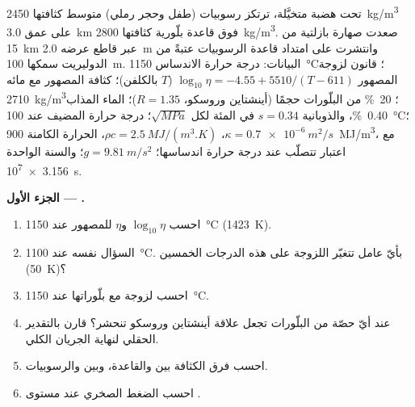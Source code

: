 \begin{problem}
\label{pb:b2:magma-emplacement:1}
تحت هضبة متخيَّلة، ترتكز رسوبيات (طفل وحجر رملي) متوسط كثافتها
\qty{2450}{kg/m^3} على عمق \qty{3.0}{km} فوق قاعدة بلّورية
كثافتها \qty{2800}{kg/m^3}. صعدت صهارة بازلتية من \qty{15}{km} عبر قاطع
عرضه \qty{2.0}{m} وانتشرت على امتداد قاعدة الرسوبيات عتبةً من الدوليريت
سمكها \qty{100}{m}. البيانات: درجة حرارة الاندساس \qty{1150}{\celsius}؛ قانون لزوجة
المصهور $\log_{10}\eta = -4.55 + 5510/(T - 611)$ ($T$ بالكلفن)؛ كثافة
المصهور مع مائه \qty{2710}{kg/m^3}؛ \qty{20}{\percent} من البلّورات حجمًا
(أينشتاين وروسكو، $R = 1.35$)؛ الماء المذاب \qty{0.40}{\percent}، والذوبانية
$s = 0.34$ في المئة لكل $\sqrt{\unit{MPa}}$؛ درجة حرارة المضيف عند 
\qty{100}{\celsius}؛ $\kappa = \qty{0.7e-6}{m^2/s}$، $\rho c = \qty{2.5}{MJ/(m^3.K)}$،
الحرارة الكامنة \qty{900}{MJ/m^3}، مع اعتبار  تتصلّب عند درجة حرارة
اندساسها؛ $g = \qty{9.81}{m/s^2}$؛ والسنة الواحدة \qty{3.156e7}{s}.

\medskip\noindent\textbf{الجزء الأول --- .}
\begin{enumerate}
\item احسب $\log_{10}\eta$ و$\eta$ للمصهور عند \qty{1150}{\celsius}
(\qty{1423}{K}).
\item السؤال نفسه عند \qty{1100}{\celsius}. بأيّ عامل تتغيّر اللزوجة على
هذه الدرجات الخمسين (\qty{50}{K})؟
\item احسب لزوجة  مع بلّوراتها عند
\qty{1150}{\celsius}.
\item عند أيّ حصّة من البلّورات تجعل علاقة أينشتاين وروسكو
 تنحشر؟ قارن بالتقدير الحقلي لنهاية الجريان الكلي.
\item احسب فرق الكثافة بين  والقاعدة،
وبين  والرسوبيات.
\item احسب الضغط الصخري عند مستوى .
\end{enumerate}


\end{problem}
